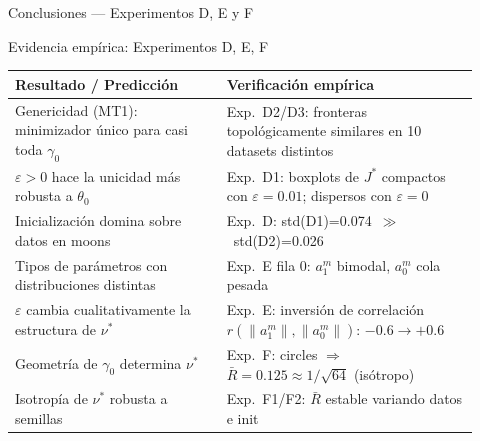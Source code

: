 \documentclass[10pt]{beamer}
\begin{document}
\begin{frame}{Conclusiones — Experimentos D, E y F}

\begin{block}{Evidencia empírica: Experimentos D, E, F}
\small
\begin{tabular}{p{0.42\linewidth}p{0.50\linewidth}}
  \toprule
  Resultado / Predicción & Verificación empírica \\
  \midrule
  Genericidad (MT1): minimizador único para casi toda $\gamma_0$ &
    Exp.\ D2/D3: fronteras topológicamente similares en 10 datasets distintos \\[4pt]
  $\varepsilon>0$ hace la unicidad más robusta a $\theta_0$ &
    Exp.\ D1: boxplots de $J^*$ compactos con $\varepsilon=0.01$; dispersos con $\varepsilon=0$ \\[4pt]
  Inicialización domina sobre datos en moons &
    Exp.\ D: std(D1)=0.074~$\gg$~std(D2)=0.026 \\[4pt]
  Tipos de parámetros con distribuciones distintas &
    Exp.\ E fila 0: $a_1^m$ bimodal, $a_0^m$ cola pesada \\[4pt]
  $\varepsilon$ cambia cualitativamente la estructura de $\nu^*$ &
    Exp.\ E: inversión de correlación $r(\|a_1^m\|,\|a_0^m\|)$: $-0.6\to+0.6$ \\[4pt]
  Geometría de $\gamma_0$ determina $\nu^*$ &
    Exp.\ F: circles $\Rightarrow$ $\bar{R}=0.125\approx 1/\sqrt{64}$ (isótropo) \\[4pt]
  Isotropía de $\nu^*$ robusta a semillas &
    Exp.\ F1/F2: $\bar{R}$ estable variando datos e init \\
  \bottomrule
\end{tabular}
\end{block}

\end{frame}
\end{document}
